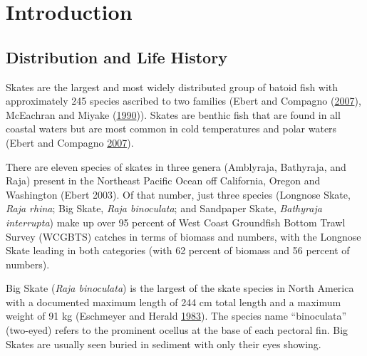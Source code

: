 \documentclass[12pt,]{article}
\begin{document}
\FloatBarrier

\newpage
\renewcommand{\thefigure}{\arabic{figure}}
\renewcommand{\thetable}{\arabic{table}}
\setcounter{figure}{0}
\setcounter{table}{0}

\newpage
\renewcommand{\thefigure}{\arabic{figure}}
\renewcommand{\thetable}{\arabic{table}}
\setcounter{figure}{0}
\setcounter{table}{0}

\hypertarget{introduction}{%
\section{Introduction}\label{introduction}}

\hypertarget{distribution-and-life-history}{%
\subsection{Distribution and Life
History}\label{distribution-and-life-history}}

Skates are the largest and most widely distributed group of batoid fish
with approximately 245 species ascribed to two families (Ebert and
Compagno (\protect\hyperlink{ref-Ebert2007}{2007}), McEachran and Miyake
(\protect\hyperlink{ref-McEachran1990}{1990})). Skates are benthic fish
that are found in all coastal waters but are most common in cold
temperatures and polar waters (Ebert and Compagno
\protect\hyperlink{ref-Ebert2007}{2007}).

There are eleven species of skates in three genera (Amblyraja,
Bathyraja, and Raja) present in the Northeast Pacific Ocean off
California, Oregon and Washington (Ebert 2003). Of that number, just
three species (Longnose Skate, \emph{Raja rhina}; Big Skate, \emph{Raja
binoculata}; and Sandpaper Skate, \emph{Bathyraja interrupta}) make up
over 95 percent of West Coast Groundfish Bottom Trawl Survey (WCGBTS)
catches in terms of biomass and numbers, with the Longnose Skate leading
in both categories (with 62 percent of biomass and 56 percent of
numbers).

Big Skate (\emph{Raja binoculata}) is the largest of the skate species
in North America with a documented maximum length of 244 cm total length
and a maximum weight of 91 kg (Eschmeyer and Herald
\protect\hyperlink{ref-Eschmeyer1983}{1983}). The species name
``binoculata'' (two-eyed) refers to the prominent ocellus at the base of
each pectoral fin. Big Skates are usually seen buried in sediment with
only their eyes showing.
\end{document}
